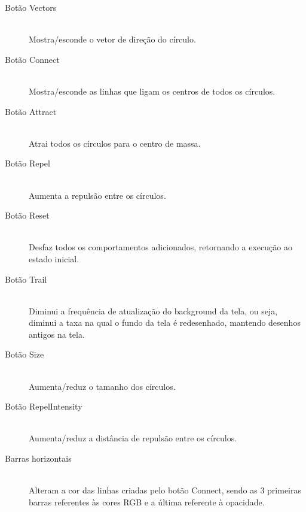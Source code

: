 \documentclass[12pt]{article}
\begin{document}
\begin{description}

\item[Botão Vectors] \hfill \\
Mostra/esconde o vetor de direção do círculo.
\vspace{0.4 true cm}

\item[Botão Connect] \hfill \\
Mostra/esconde as linhas que ligam os centros de todos os círculos.
\vspace{0.4 true cm}

\item[Botão Attract] \hfill \\
Atrai todos os círculos para o centro de massa.
\vspace{0.4 true cm}

\item[Botão Repel] \hfill \\
Aumenta a repulsão entre os círculos.
\vspace{0.4 true cm}

\item[Botão Reset] \hfill \\
Desfaz todos os comportamentos adicionados, retornando a execução ao estado inicial.
\vspace{0.4 true cm}

\item[Botão Trail] \hfill \\
Diminui a frequência de atualização do background da tela, ou seja, diminui a taxa na qual o fundo da tela é redesenhado, 
mantendo desenhos antigos na tela.
\vspace{0.4 true cm}

\item[Botão Size] \hfill \\
Aumenta/reduz o tamanho dos círculos.
\vspace{0.4 true cm}

\item[Botão RepelIntensity] \hfill \\
Aumenta/reduz a distância de repulsão entre os círculos.
\vspace{0.4 true cm}

\item[Barras horizontais] \hfill \\
Alteram a cor das linhas criadas pelo botão Connect, sendo as 3 primeiras barras referentes às cores RGB e a última referente à opacidade.
\vspace{0.4 true cm}


\end{description}
\end{document}
